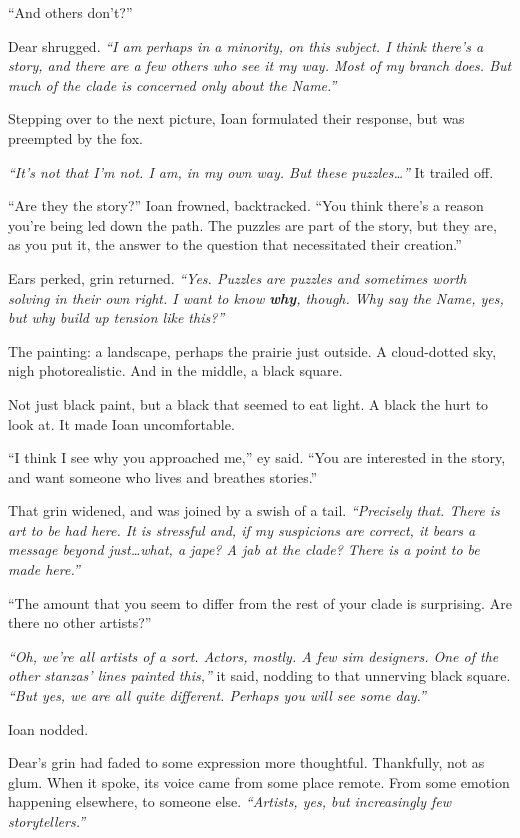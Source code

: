 ``And others don't?''

Dear shrugged. \emph{``I am perhaps in a minority, on this subject. I think there's a story, and there are a few others who see it my way. Most of my branch does. But much of the clade is concerned only about the Name.''}

Stepping over to the next picture, Ioan formulated their response, but was preempted by the fox.

\emph{``It's not that I'm not. I am, in my own way. But these puzzles\ldots{}''} It trailed off.

``Are they the story?'' Ioan frowned, backtracked. ``You think there's a reason you're being led down the path. The puzzles are part of the story, but they are, as you put it, the answer to the question that necessitated their creation.''

Ears perked, grin returned. \emph{``Yes. Puzzles are puzzles and sometimes worth solving in their own right. I want to know \textbf{why}, though. Why say the Name, yes, but why build up tension like this?''}

The painting: a landscape, perhaps the prairie just outside. A cloud-dotted sky, nigh photorealistic. And in the middle, a black square.

Not just black paint, but a black that seemed to eat light. A black the hurt to look at. It made Ioan uncomfortable.

``I think I see why you approached me,'' ey said. ``You are interested in the story, and want someone who lives and breathes stories.''

That grin widened, and was joined by a swish of a tail. \emph{``Precisely that. There is art to be had here. It is stressful and, if my suspicions are correct, it bears a message beyond just\ldots{}what, a jape? A jab at the clade? There is a point to be made here.''}

``The amount that you seem to differ from the rest of your clade is surprising. Are there no other artists?''

\emph{``Oh, we're all artists of a sort. Actors, mostly. A few sim designers. One of the other stanzas' lines painted this,''} it said, nodding to that unnerving black square. \emph{``But yes, we are all quite different. Perhaps you will see some day.''}

Ioan nodded.

Dear's grin had faded to some expression more thoughtful. Thankfully, not as glum. When it spoke, its voice came from some place remote. From some emotion happening elsewhere, to someone else. \emph{``Artists, yes, but increasingly few storytellers.''}
